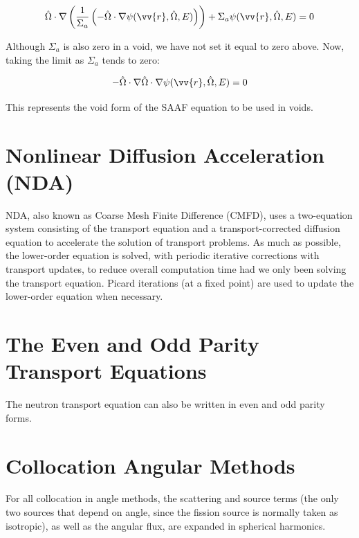 \documentclass[10pt]{article}
\newcommand{\hO}{\hat{\Omega}}
\begin{document}
\begin{flushleft}
\begin{equation}
\label{eq:SAAFvoid1}
\hO   \cdot \nabla \left( \frac{1}{\Sigma_a}\left(-\hO  \cdot\nabla\psi(\vv{r}, \hO  , E)\right)\right) + \Sigma_a\psi(\vv{r}, \hO  , E) = 0
\end{equation}

Although \(\Sigma_a\) is also zero in a void, we have not set it equal to zero above. Now, taking the limit as \(\Sigma_a\) tends to zero:

\begin{equation}
\label{eq:SAAFvoid2}
-\hO   \cdot \nabla\hO  \cdot\nabla\psi(\vv{r}, \hO  , E) = 0
\end{equation}

This represents the void form of the SAAF equation to be used in voids.



\clearpage
\section{Nonlinear Diffusion Acceleration (NDA)}


NDA, also known as Coarse Mesh Finite Difference (CMFD), uses a two-equation system consisting of the transport equation and a transport-corrected diffusion equation to accelerate the solution of transport problems. As much as possible, the lower-order equation is solved, with periodic iterative corrections with transport updates, to reduce overall computation time had we only been solving the transport equation. Picard iterations (at a fixed point) are used to update the lower-order equation when necessary. 



\clearpage
\section{The Even and Odd Parity Transport Equations}

The neutron transport equation can also be written in even and odd parity forms.




\clearpage
\section{Collocation Angular Methods}

For all collocation in angle methods, the scattering and source terms (the only two sources that depend on angle, since the fission source is normally taken as isotropic), as well as the angular flux, are expanded in spherical harmonics. 


\end{flushleft}
\end{document}

